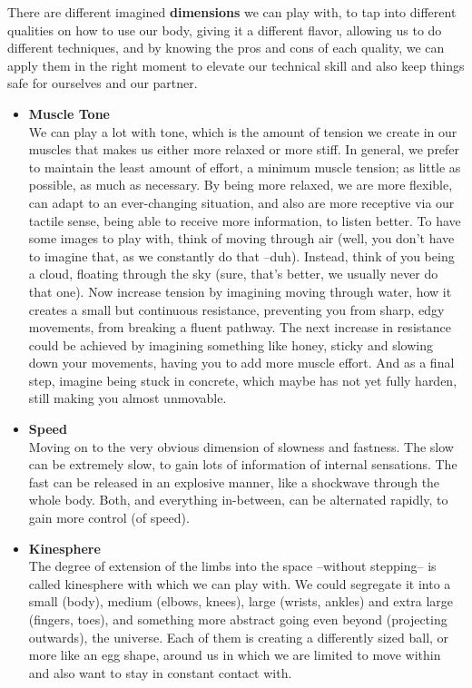 There are different imagined \textbf{dimensions} we can play with, to tap into different qualities on how to use our body, giving it a different flavor, allowing us to do different techniques, and by knowing the pros and cons of each quality, we can apply them in the right moment to elevate our technical skill and also keep things safe for ourselves and our partner.

\begin{itemize}
    \item [] \textbf{Muscle Tone} \\
    We can play a lot with tone, which is the amount of tension we create in our muscles that makes us either more relaxed or more stiff.
    In general, we prefer to maintain the least amount of effort, a minimum muscle tension; as little as possible, as much as necessary.
    By being more relaxed, we are more flexible, can adapt to an ever-changing situation, and also are more receptive via our tactile sense, being able to receive more information, to listen better.
    To have some images to play with, think of moving through air (well, you don't have to imagine that, as we constantly do that --duh).
    Instead, think of you being a cloud, floating through the sky (sure, that's better, we usually never do that one).
    Now increase tension by imagining moving through water, how it creates a small but continuous resistance, preventing you from sharp, edgy movements, from breaking a fluent pathway.
    The next increase in resistance could be achieved by imagining something like honey, sticky and slowing down your movements, having you to add more muscle effort.
    And as a final step, imagine being stuck in concrete, which maybe has not yet fully harden, still making you almost unmovable.

    \item [] \textbf{Speed} \\
    Moving on to the very obvious dimension of slowness and fastness.
    The slow can be extremely slow, to gain lots of information of internal sensations.
    The fast can be released in an explosive manner, like a shockwave through the whole body.
    Both, and everything in-between, can be alternated rapidly, to gain more control (of speed).

    \item [] \textbf{Kinesphere} \\
    The degree of extension of the limbs into the space --without stepping-- is called \gls{kinesphere} with which we can play with.
    We could segregate it into a small (body), medium (elbows, knees), large (wrists, ankles) and extra large (fingers, toes), and something more abstract going even beyond (projecting outwards), the universe.
    Each of them is creating a differently sized ball, or more like an egg shape, around us in which we are limited to move within and also want to stay in constant contact with.


\end{itemize}
